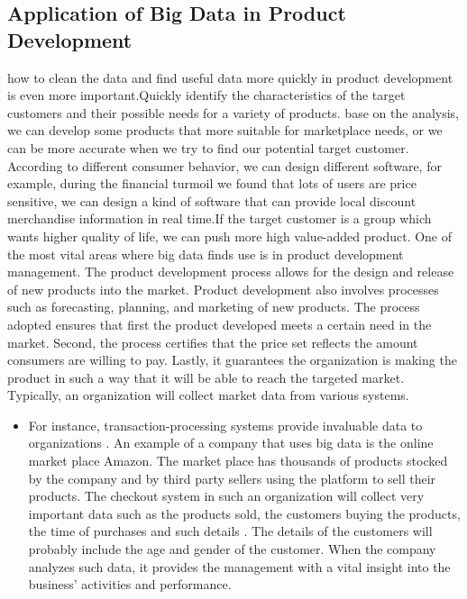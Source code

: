 \documentclass[sigconf]{acmart}
\begin{document}
\subsection{Application of Big Data in Product Development}
how to clean the data and find useful data more quickly in product development is even more important.Quickly identify the characteristics of the target customers and their possible needs for a variety of products. base on the analysis, we can develop some products that more suitable for marketplace needs, or we can be more accurate when we try to find our potential target customer. According to different consumer behavior, we can design different software, for example, during the financial turmoil we found that lots of users are price sensitive, we can design a kind of software that can provide local discount merchandise information in real time.If the target customer is a group which wants higher quality of life, we can push more high value-added product.
One of the most vital areas where big data finds use is in product development management. The product development process allows for the design and release of new products into the market. Product development also involves processes such as forecasting, planning, and marketing of new products. The process adopted ensures that first the product developed meets a certain need in the market. Second, the process certifies that the price set reflects the amount consumers are willing to pay. Lastly, it guarantees the organization is making the product in such a way that it will be able to reach the targeted market. Typically, an organization will collect market data from various systems.

\begin{itemize}

  \item For instance, transaction-processing systems provide invaluable data to organizations \cite{Provost2013}. An example of a company that uses big data is the online market place Amazon. The market place has thousands of products stocked by the company and by third party sellers using the platform to sell their products. The checkout system in such an organization will collect very important data such as the products sold, the customers buying the products, the time of purchases and such details \cite{Walker2015}. The details of the customers will probably include the age and gender of the customer. When the company analyzes such data, it provides the management with a vital insight into the business’ activities and performance.
\end{itemize}
\end{document}
